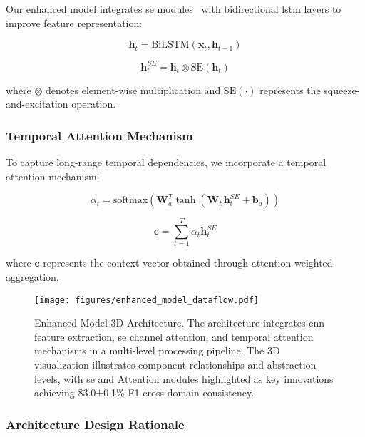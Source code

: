 \documentclass[journal]{IEEEtran}
\begin{document}
Our enhanced model integrates \gls{se} modules~\cite{se_networks2018} with bidirectional \gls{lstm} layers to improve feature representation:

\begin{equation}
\mathbf{h}_t = \text{BiLSTM}(\mathbf{x}_t, \mathbf{h}_{t-1})
\end{equation}

\begin{equation}
\mathbf{h}_t^{SE} = \mathbf{h}_t \otimes \text{SE}(\mathbf{h}_t)
\end{equation}

where $\otimes$ denotes element-wise multiplication and $\text{SE}(\cdot)$ represents the squeeze-and-excitation operation.

\subsubsection{Temporal Attention Mechanism}

To capture long-range temporal dependencies, we incorporate a temporal attention mechanism:

\begin{equation}
\alpha_t = \text{softmax}(\mathbf{W}_a^T \tanh(\mathbf{W}_h \mathbf{h}_t^{SE} + \mathbf{b}_a))
\end{equation}

\begin{equation}
\mathbf{c} = \sum_{t=1}^{T} \alpha_t \mathbf{h}_t^{SE}
\end{equation}

where $\mathbf{c}$ represents the context vector obtained through attention-weighted aggregation.

\begin{figure}[ht]
\centering
\texttt{[image: figures/enhanced\_model\_dataflow.pdf]}%
\caption{Enhanced Model 3D Architecture. The architecture integrates \gls{cnn} feature extraction, \gls{se} channel attention, and temporal attention mechanisms in a multi-level processing pipeline. The 3D visualization illustrates component relationships and abstraction levels, with \gls{se} and Attention modules highlighted as key innovations achieving 83.0±0.1\% F1 cross-domain consistency.}
\label{fig:enhanced_3d_arch}
\end{figure}

\subsubsection{Architecture Design Rationale}
\end{document}
